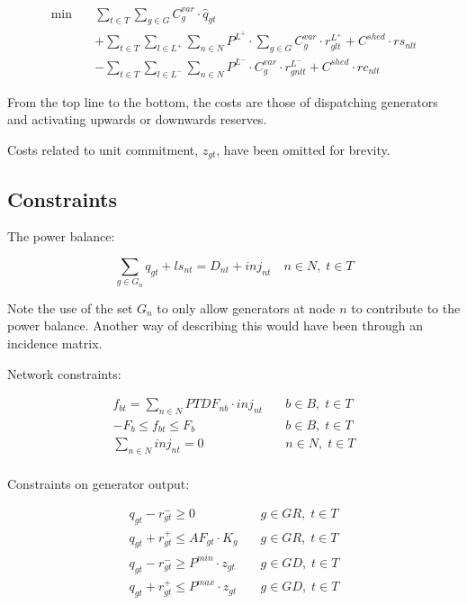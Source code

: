\documentclass[number,times]{elsarticle}
\begin{document}
\begin{align}
    \min \quad & \sum_{t \in T} \sum_{g \in G} C^{var}_{g} \cdot \hat{q}_{gt} \nonumber                                                                  \\
               & + \sum_{t \in T} \sum_{l \in L^+} \sum_{n \in N} P^{L^+} \cdot \sum_{g \in G} C^{var}_{g} \cdot r^{L^+}_{glt} + C^{shed} \cdot rs_{nlt} \\
               & - \sum_{t \in T} \sum_{l \in L^-} \sum_{n \in N} P^{L^-} \cdot C^{var}_{g} \cdot r^{L^-}_{gnlt} + C^{shed} \cdot rc_{nlt} \nonumber
\end{align}

From the top line to the bottom, the costs are those of dispatching generators and activating upwards or downwards reserves.

Costs related to unit commitment, $z_{gt}$, have been omitted for brevity.

\subsection{Constraints}

The power balance:

\begin{equation}
    \sum_{g \in G_n} q_{gt} + ls_{nt} = D_{nt} + inj_{nt} \quad n \in N, \; t \in T
\end{equation}

Note the use of the set $G_n$ to only allow generators at node $n$ to contribute to the power balance. Another way of describing this would have been through an incidence matrix.

Network constraints:

\begin{align}
    f_{bt} = \sum_{n \in N} PTDF_{nb} \cdot inj_{nt} & \quad b \in B, \; t \in T \\
    -F_b \leq f_{bt} \leq F_b                        & \quad b \in B, \; t \in T \\
    \sum_{n \in N} inj_{nt} = 0                      & \quad n \in N, \; t \in T \\
\end{align}

Constraints on generator output:

\begin{align}
    q_{gt} - r^{-}_{gt} \geq 0                    & \quad g \in GR, \; t \in T \\
    q_{gt} + r^{+}_{gt} \leq AF_{gt} \cdot K_g    & \quad g \in GR, \; t \in T \\
    q_{gt} - r^{-}_{gt} \geq P^{min} \cdot z_{gt} & \quad g \in GD, \; t \in T \\
    q_{gt} + r^{+}_{gt} \leq P^{max} \cdot z_{gt} & \quad g \in GD, \; t \in T
\end{align}
\end{document}
